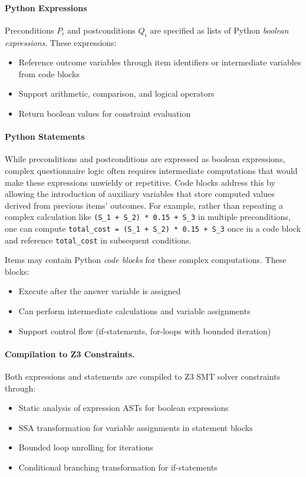 \paragraph{Python Expressions}
Preconditions $P_i$ and postconditions $Q_i$ are specified as lists of Python \emph{boolean expressions}. These expressions:
\begin{itemize}
    \item Reference outcome variables through item identifiers or intermediate variables from code blocks
    \item Support arithmetic, comparison, and logical operators
    \item Return boolean values for constraint evaluation
\end{itemize}

\paragraph{Python Statements}
While preconditions and postconditions are expressed as boolean expressions, complex questionnaire logic often requires intermediate computations that would make these expressions unwieldy or repetitive. Code blocks address this by allowing the introduction of auxiliary variables that store computed values derived from previous items' outcomes. For example, rather than repeating a complex calculation like \texttt{(S\_1 + S\_2) * 0.15 + S\_3} in multiple preconditions, one can compute \texttt{total\_cost = (S\_1 + S\_2) * 0.15 + S\_3} once in a code block and reference \texttt{total\_cost} in subsequent conditions.

Items may contain Python \emph{code blocks} for these complex computations. These blocks:
\begin{itemize}
    \item Execute after the answer variable is assigned
    \item Can perform intermediate calculations and variable assignments
    \item Support control flow (if-statements, for-loops with bounded iteration)
\end{itemize}

\paragraph{Compilation to Z3 Constraints.}
Both expressions and statements are compiled to Z3 SMT solver constraints through:
\begin{itemize}
    \item Static analysis of expression ASTs for boolean expressions
    \item SSA transformation for variable assignments in statement blocks
    \item Bounded loop unrolling for iterations
    \item Conditional branching transformation for if-statements
\end{itemize}

